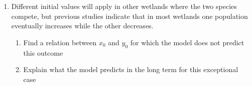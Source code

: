 \documentclass[leqno]{article}
\begin{document}
\begin{enumerate}[
  label=\textbf{\arabic*.},
  leftmargin=*,
  topsep=0pt,
  partopsep=0pt,
  parsep=0pt
]
\begin{enumerate}[label=\textbf{(\alph*)}, resume]
\begin{enumerate}[label=(\roman*)]
  \end{enumerate}
  \item Different initial values will apply in other wetlands where the two species compete, but previous studies indicate that in most wetlands one population eventually increases while the other decreases.\\
  \begin{enumerate}[label=(\roman*)]
    \item Find a relation between $x_0$ and $y_0$ for which the model does not predict this outcome  
    \item Explain what the model predicts in the long term for this exceptional case  
  \end{enumerate}
\end{enumerate}
\end{enumerate}
\end{document}
